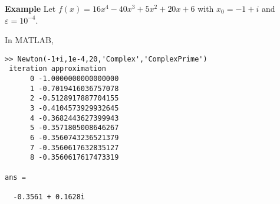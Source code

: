 \documentclass [titlepage,12pt,letter] {article}
\begin{document}
{\bf Example} Let $f(x)=16x^4-40x^3+5x^2+20x+6$ with $x_0=-1+i$ and $\varepsilon = 10^{-4}$.

\noindent
In MATLAB,

\begin{verbatim}
>> Newton(-1+i,1e-4,20,'Complex','ComplexPrime')
 iteration approximation 
      0 -1.0000000000000000 
      1 -0.7019416036757078 
      2 -0.5128917887704155 
      3 -0.4104573929932645 
      4 -0.3682443627399943 
      5 -0.3571805008646267 
      6 -0.3560743236521379 
      7 -0.3560617632835127 
      8 -0.3560617617473319 

ans =

  -0.3561 + 0.1628i
\end{verbatim}
\end{document}
